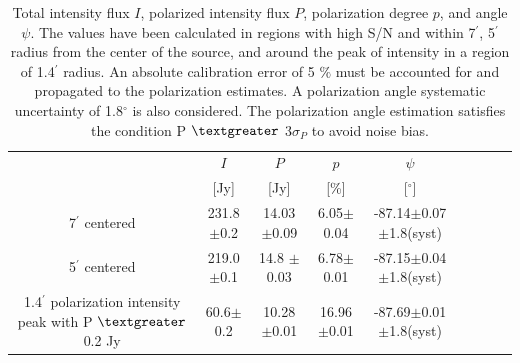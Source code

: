 \documentclass[twocolumn,traditabstract]{aa}
\begin{document}
\begin{table}
  \centering
      \begin{tabular}{ccccccccc}
      \hline
      \hline
       & $I$ & $P$ & $p$ & $\psi$  \\ 
                                         & [Jy]         &    [Jy]         & [\%]  & [$^\circ$] \\
      \hline
      \hline
    7$^{\prime}$ centered   & 231.8$\pm$0.2  & 14.03$\pm$0.09 & 6.05$\pm$0.04 & -87.14$\pm$0.07$\pm$1.8(syst)  \\ 
 
          5$^{\prime}$ centered & 219.0$\pm$0.1  & 14.8 $\pm$0.03 & 6.78$\pm$0.01 & -87.15$\pm$0.04$\pm$1.8(syst)    \\ 
     	      
              1.4$^{\prime}$ polarization intensity peak with P $\textgreater$ 0.2 Jy& 60.6$\pm$0.2 & 10.28$\pm$0.01  & 16.96$\pm$0.01 &-87.69$\pm$0.01$\pm$1.8(syst)\\
              
             
                \hline            
    \hline   
    \end{tabular}
   \caption{ Total intensity flux $I$, polarized intensity flux $P$, polarization degree $p$, and angle $\psi$. The values have been calculated in regions with high S/N and within 7$^{\prime}$, 5$^{\prime}$ radius from the center of the source, and around the peak of intensity in a region of 1.4$^{\prime}$ radius. An absolute calibration error of 5 $\%$ must be accounted for and propagated to the polarization estimates. A polarization angle systematic uncertainty of 1.8$^{\circ}$ is also considered.
   The polarization angle estimation satisfies the condition P $\textgreater$ 3$\sigma_P$ to avoid noise bias. 
    }
    \label{tab:crab_results}
 \end{table}
  
\end{document}
